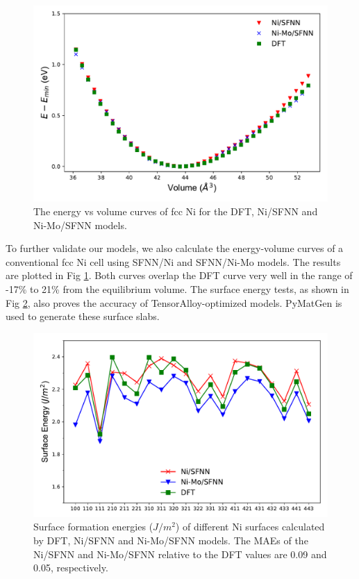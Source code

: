 \documentclass[preprint]{revtex4-2}
\begin{document}
\begin{figure}[h!]
    \centering
    \includegraphics[scale=0.8]{figures/Fig6-energy-volume.pdf}
\caption{\label{fig:energy_volume_Ni} The energy vs volume curves of fcc Ni for
the DFT, Ni/SFNN and Ni-Mo/SFNN models.}
\end{figure}

To further validate our models, we also calculate the energy-volume curves of a 
conventional fcc Ni cell using SFNN/Ni and SFNN/Ni-Mo models. The results are 
plotted in Fig \ref{fig:energy_volume_Ni}. Both curves overlap the DFT curve 
very well in the range of -17\% to 21\% from the equilibrium volume. The surface
energy tests, as shown in Fig \ref{fig:surface_energy_Ni}, also proves the 
accuracy of TensorAlloy-optimized models. PyMatGen\cite{pymatgen,pymatgen-1} is 
used to generate these surface slabs.

\begin{figure}[h!]
    \centering
    \includegraphics[scale=0.8]{figures/Fig7-surface-energy.pdf}
\caption{\label{fig:surface_energy_Ni} Surface formation energies ($J/m^2$) of 
different Ni surfaces calculated by DFT, Ni/SFNN and Ni-Mo/SFNN models. 
The MAEs of the Ni/SFNN and Ni-Mo/SFNN relative to the DFT values are 0.09 and 
0.05, respectively.}
\end{figure}
\end{document}
